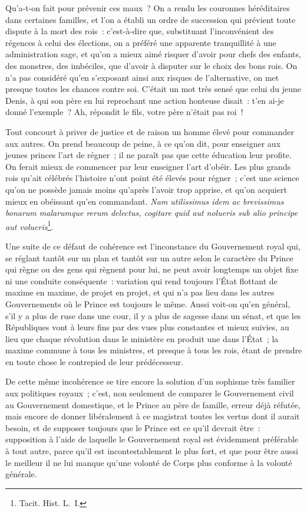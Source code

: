 \documentclass[french,twoside]{book} %
\begin{document}
Qu’a-t-on fait pour prévenir ces maux ? On a rendu les couronnes héréditaires dans certaines familles, et l’on a établi un ordre de succession qui prévient toute dispute à la mort des rois : c’est-à-dire que, substituant l’inconvénient des régences à celui des élections, on a préféré une apparente tranquillité à une administration sage, et qu’on a mieux aimé risquer d’avoir pour chefs des enfants, des monstres, des imbéciles, que d’avoir à disputer sur le choix des bons rois. On n’a pas considéré qu’en s’exposant ainsi aux risques de l’alternative, on met presque toutes les chances contre soi. C’était un mot très sensé que celui du jeune Denis, à qui son père en lui reprochant une action honteuse disait : t’en ai-je donné l’exemple ? Ah, répondit le fils, votre père n’était pas roi !\par
Tout concourt à priver de justice et de raison un homme élevé pour commander aux autres. On prend beaucoup de peine, à ce qu’on dit, pour enseigner aux jeunes princes l’art de régner ; il ne paraît pas que cette éducation leur profite. On ferait mieux de commencer par leur enseigner l’art d’obéir. Les plus grands rois qu’ait célébrés l’histoire n’ont point été élevés pour régner ; c’est une science qu’on ne possède jamais moins qu’après l’avoir trop apprise, et qu’on acquiert mieux en obéissant qu’en commandant. {\itshape Nam utilissimus idem ac brevissimus bonarum malarumque rerum delectus, cogitare quid aut nolueris sub alio principe aut volueris}\footnote{Tacit. Hist. L. I.}.\par
Une suite de ce défaut de cohérence est l’inconstance du Gouvernement royal qui, se réglant tantôt sur un plan et tantôt sur un autre selon le caractère du Prince qui règne ou des gens qui règnent pour lui, ne peut avoir longtemps un objet fixe ni une conduite conséquente : variation qui rend toujours l’État flottant de maxime en maxime, de projet en projet, et qui n’a pas lieu dans les autres Gouvernements où le Prince est toujours le même. Aussi voit-on qu’en général, s’il y a plus de ruse dans une cour, il y a plus de sagesse dans un sénat, et que les Républiques vont à leurs fins par des vues plus constantes et mieux suivies, au lieu que chaque révolution dans le ministère en produit une dans l’État ; la maxime commune à tous les ministres, et presque à tous les rois, étant de prendre en toute chose le contrepied de leur prédécesseur.\par
De cette même incohérence se tire encore la solution d’un sophisme très familier aux politiques royaux ; c’est, non seulement de comparer le Gouvernement civil au Gouvernement domestique, et le Prince au père de famille, erreur déjà réfutée, mais encore de donner libéralement à ce magistrat toutes les vertus dont il aurait besoin, et de supposer toujours que le Prince est ce qu’il devrait être : supposition à l’aide de laquelle le Gouvernement royal est évidemment préférable à tout autre, parce qu’il est incontestablement le plus fort, et que pour être aussi le meilleur il ne lui manque qu’une volonté de Corps plus conforme à la volonté générale.\par
\end{document}
